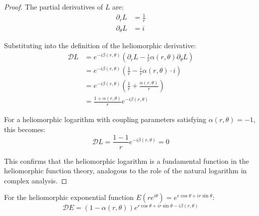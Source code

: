\begin{proof}
The partial derivatives of $L$ are:
\begin{align}
\partial_rL &= \frac{1}{r}\\
\partial_\theta L &= i
\end{align}

Substituting into the definition of the heliomorphic derivative:
\begin{align}
\mathcal{D}L &= e^{-i\beta(r,\theta)}\left(\partial_rL - \frac{i}{r}\alpha(r,\theta)\partial_\theta L\right)\\
&= e^{-i\beta(r,\theta)}\left(\frac{1}{r} - \frac{i}{r}\alpha(r,\theta) \cdot i\right)\\
&= e^{-i\beta(r,\theta)}\left(\frac{1}{r} + \frac{\alpha(r,\theta)}{r}\right)\\
&= \frac{1 + \alpha(r,\theta)}{r}e^{-i\beta(r,\theta)}
\end{align}

For a heliomorphic logarithm with coupling parameters satisfying $\alpha(r,\theta) = -1$, this becomes:
\begin{equation}
\mathcal{D}L = \frac{1 - 1}{r}e^{-i\beta(r,\theta)} = 0
\end{equation}

This confirms that the heliomorphic logarithm is a fundamental function in the heliomorphic function theory, analogous to the role of the natural logarithm in complex analysis.
\end{proof}

\begin{theorem}
For the heliomorphic exponential function $E(re^{i\theta}) = e^{r\cos\theta + ir\sin\theta}$:
\begin{equation}
\mathcal{D}E = \left(1 - \alpha(r,\theta)\right)e^{r\cos\theta + ir\sin\theta - i\beta(r,\theta)}
\end{equation}
\end{theorem}

